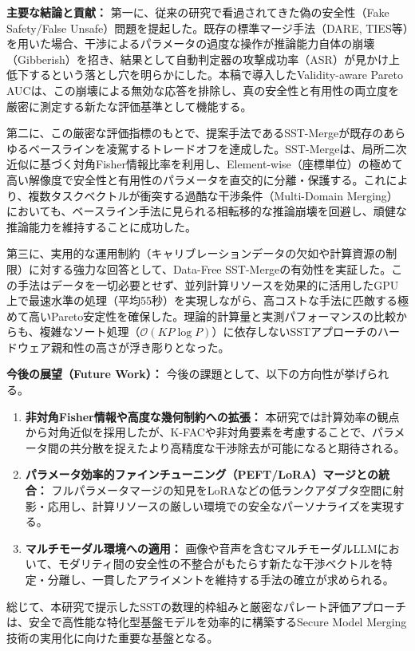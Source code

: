 \documentclass{article}
\begin{document}
\textbf{主要な結論と貢献：}
第一に、従来の研究で看過されてきた偽の安全性（Fake Safety/False Unsafe）問題を提起した。既存の標準マージ手法（DARE, TIES等）を用いた場合、干渉によるパラメータの過度な操作が推論能力自体の崩壊（Gibberish）を招き、結果として自動判定器の攻撃成功率（ASR）が見かけ上低下するという落とし穴を明らかにした。本稿で導入したValidity-aware Pareto AUCは、この崩壊による無効な応答を排除し、真の安全性と有用性の両立度を厳密に測定する新たな評価基準として機能する。

第二に、この厳密な評価指標のもとで、提案手法であるSST-Mergeが既存のあらゆるベースラインを凌駕するトレードオフを達成した。SST-Mergeは、局所二次近似に基づく対角Fisher情報比率を利用し、Element-wise（座標単位）の極めて高い解像度で安全性と有用性のパラメータを直交的に分離・保護する。これにより、複数タスクベクトルが衝突する過酷な干渉条件（Multi-Domain Merging）においても、ベースライン手法に見られる相転移的な推論崩壊を回避し、頑健な推論能力を維持することに成功した。

第三に、実用的な運用制約（キャリブレーションデータの欠如や計算資源の制限）に対する強力な回答として、Data-Free SST-Mergeの有効性を実証した。この手法はデータを一切必要とせず、並列計算リソースを効果的に活用したGPU上で最速水準の処理（平均55秒）を実現しながら、高コストな手法に匹敵する極めて高いPareto安定性を確保した。理論的計算量と実測パフォーマンスの比較からも、複雑なソート処理（$\mathcal{O}(KP \log P)$）に依存しないSSTアプローチのハードウェア親和性の高さが浮き彫りとなった。

\textbf{今後の展望（Future Work）：}
今後の課題として、以下の方向性が挙げられる。
\begin{enumerate}
    \item \textbf{非対角Fisher情報や高度な幾何制約への拡張：} 本研究では計算効率の観点から対角近似を採用したが、K-FACや非対角要素を考慮することで、パラメータ間の共分散を捉えたより高精度な干渉除去が可能になると期待される。
    \item \textbf{パラメータ効率的ファインチューニング（PEFT/LoRA）マージとの統合：} フルパラメータマージの知見をLoRAなどの低ランクアダプタ空間に射影・応用し、計算リソースの厳しい環境での安全なパーソナライズを実現する。
    \item \textbf{マルチモーダル環境への適用：} 画像や音声を含むマルチモーダルLLMにおいて、モダリティ間の安全性の不整合がもたらす新たな干渉ベクトルを特定・分離し、一貫したアライメントを維持する手法の確立が求められる。
\end{enumerate}

総じて、本研究で提示したSSTの数理的枠組みと厳密なパレート評価アプローチは、安全で高性能な特化型基盤モデルを効率的に構築するSecure Model Merging技術の実用化に向けた重要な基盤となる。
\end{document}
